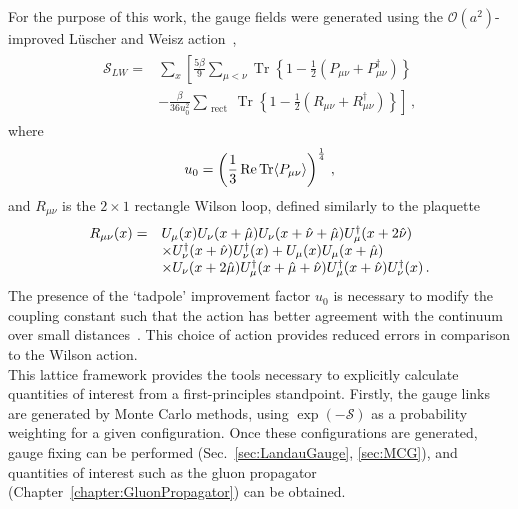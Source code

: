 For the purpose of this work, the gauge fields were generated using the $\mathcal{O}(a^2)$-improved L\"uscher and Weisz action~\cite{Luscher:1984xn}, 
%
\begin{align}
\begin{aligned} \mathcal{S} _ { LW } = &\sum_x \left[ \frac { 5 \beta } { 9 } \sum _ { \mu < \nu } \operatorname { Tr } \left\{ 1 - \frac { 1 } { 2 } \left( P _ { \mu \nu } + P _ { \mu \nu } ^ { \dagger } \right) \right\}\right. \\
& \left.- \frac { \beta } { 36 u _ { 0 } ^ { 2 } } \sum _ { \text { rect } } \operatorname { Tr } \left\{ 1 - \frac { 1 } { 2 } \left( R _ { \mu \nu } + R _ { \mu \nu } ^ { \dagger } \right) \right\}\right]\, , \end{aligned}
\end{align}
%
where
\begin{equation}
u_0 = \left(\frac{1}{3}\operatorname{ Re } \operatorname{Tr}\langle P_{\mu\nu} \rangle\right)^{\frac{1}{4}}\, ,
\end{equation}
and $R_{\mu\nu}$ is the $2\times 1$ rectangle Wilson loop, defined similarly to the plaquette 
\begin{align}
\begin{array} { r l } { R _ { \mu \nu } ( x ) = } & { U _ { \mu } ( x ) U _ { \nu } ( x + \hat { \mu } ) U _ { \nu } ( x + \hat { \nu } + \hat { \mu } ) U _ { \mu } ^ { \dagger } ( x + 2 \hat { \nu } ) } \\ { } & { \times U _ { \nu } ^ { \dagger } ( x + \hat { \nu } ) U _ { \nu } ^ { \dagger } ( x ) + U _ { \mu } ( x ) U _ { \mu } ( x + \hat { \mu } ) } \\ { } & { \times U _ { \nu } ( x + 2 \hat { \mu } ) U _ { \mu } ^ { \dagger } ( x + \hat { \mu } + \hat { \nu } ) U _ { \mu } ^ { \dagger } ( x + \hat { \nu } ) U _ { \nu } ^ { \dagger } ( x ) }\, . \end{array}
\end{align}
The presence of the `tadpole' improvement factor $u_0$ is necessary to modify the coupling constant such that the action has better agreement with the continuum over small distances~\cite{Lepage:1992xa}. This choice of action provides reduced errors in comparison to the Wilson action.\\

This lattice framework provides the tools necessary to explicitly calculate quantities of interest from a first-principles standpoint. Firstly, the gauge links are generated by Monte Carlo methods, using $\exp\left(-\mathcal{S}\right)$ as a probability weighting for a given configuration. Once these configurations are generated, gauge fixing can be performed (Sec.~\ref{sec:LandauGauge}, \ref{sec:MCG}), and quantities of interest such as the gluon propagator (Chapter~\ref{chapter:GluonPropagator}) can be obtained.

